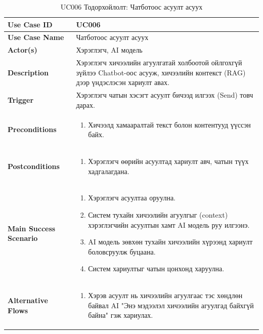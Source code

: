 \begin{longtable}{|p{4cm}|p{11cm}|}
\caption{UC006 Тодорхойлолт: Чатботоос асуулт асуух} \\
\hline
\textbf{Use Case ID} & UC006 \\ \hline
\textbf{Use Case Name} & Чатботоос асуулт асуух \\ \hline
\textbf{Actor(s)} & Хэрэглэгч, AI модель \\ \hline
\textbf{Description} & Хэрэглэгч хичээлийн агуулгатай холбоотой ойлгохгүй зүйлээ Chatbot-оос асууж, хичээлийн контекст (RAG) дээр үндэслэсэн хариулт авах. \\ \hline
\textbf{Trigger} & Хэрэглэгч чатын хэсэгт асуулт бичээд илгээх (Send) товч дарах. \\ \hline
\textbf{Preconditions} & 
\begin{enumerate}
    \item Хичээлд хамааралтай текст болон контентууд үүссэн байх.
\end{enumerate} \\ \hline
\textbf{Postconditions} & 
\begin{enumerate}
    \item Хэрэглэгч өөрийн асуултад хариулт авч, чатын түүх хадгалагдана.
\end{enumerate} \\ \hline
\textbf{Main Success Scenario} & 
\begin{enumerate}
    \item Хэрэглэгч асуултаа оруулна.
    \item Систем тухайн хичээлийн агуулгыг (context) хэрэглэгчийн асуултын хамт AI модель руу илгээнэ.
    \item AI модель зөвхөн тухайн хичээлийн хүрээнд хариулт боловсруулж буцаана.
    \item Систем хариултыг чатын цонхонд харуулна.
\end{enumerate} \\ \hline
\textbf{Alternative Flows} & 
\begin{enumerate}
    \item[3a.] Хэрэв асуулт нь хичээлийн агуулгаас тэс хөндлөн байвал AI "Энэ мэдээлэл хичээлийн агуулгад байхгүй байна" гэж хариулах.
\end{enumerate} \\ \hline
\end{longtable}

